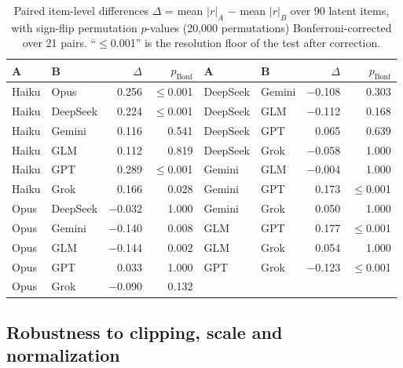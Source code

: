 \documentclass[11pt]{article}
\begin{document}
\begin{table}[h]
\centering\footnotesize
\setlength{\tabcolsep}{5pt}
\begin{tabular}{@{}llrr@{\hspace{2.2em}}llrr@{}}
\toprule
A & B & $\Delta$ & $p_\text{Bonf}$ & A & B & $\Delta$ & $p_\text{Bonf}$ \\
\midrule
Haiku & Opus & 0.256 & $\le$0.001 & DeepSeek & Gemini & $-$0.108 & 0.303 \\
Haiku & DeepSeek & 0.224 & $\le$0.001 & DeepSeek & GLM & $-$0.112 & 0.168 \\
Haiku & Gemini & 0.116 & 0.541 & DeepSeek & GPT & 0.065 & 0.639 \\
Haiku & GLM & 0.112 & 0.819 & DeepSeek & Grok & $-$0.058 & 1.000 \\
Haiku & GPT & 0.289 & $\le$0.001 & Gemini & GLM & $-$0.004 & 1.000 \\
Haiku & Grok & 0.166 & 0.028 & Gemini & GPT & 0.173 & $\le$0.001 \\
Opus & DeepSeek & $-$0.032 & 1.000 & Gemini & Grok & 0.050 & 1.000 \\
Opus & Gemini & $-$0.140 & 0.008 & GLM & GPT & 0.177 & $\le$0.001 \\
Opus & GLM & $-$0.144 & 0.002 & GLM & Grok & 0.054 & 1.000 \\
Opus & GPT & 0.033 & 1.000 & GPT & Grok & $-$0.123 & $\le$0.001 \\
Opus & Grok & $-$0.090 & 0.132 &  & & &  \\
\bottomrule
\end{tabular}
\caption{Paired item-level differences $\Delta$ = mean $|r|_A$ $-$ mean $|r|_B$ over 90 latent items, with sign-flip permutation $p$-values (20,000 permutations) Bonferroni-corrected over 21 pairs. ``$\le$0.001'' is the resolution floor of the test after correction.}
\end{table}

\subsection{Robustness to clipping, scale and normalization}
\label{app:robust}
\end{document}
